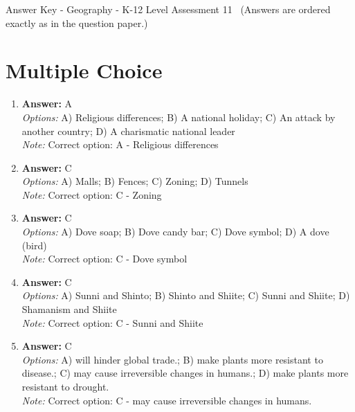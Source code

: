 \documentclass[12pt]{article}
\begin{document}
\begin{center}
Answer Key - Geography - K-12 Level Assessment 11 \
\small (Answers are ordered exactly as in the question paper.)
\end{center}

\section*{Multiple Choice}
\begin{enumerate}[label=\arabic*.]
\item \textbf{Answer:} A
\\ \textit{Options:} A) Religious differences; B) A national holiday; C) An attack by another country; D) A charismatic national leader
\\ \textit{Note:} Correct option: A - Religious differences
\item \textbf{Answer:} C
\\ \textit{Options:} A) Malls; B) Fences; C) Zoning; D) Tunnels
\\ \textit{Note:} Correct option: C - Zoning
\item \textbf{Answer:} C
\\ \textit{Options:} A) Dove soap; B) Dove candy bar; C) Dove symbol; D) A dove (bird)
\\ \textit{Note:} Correct option: C - Dove symbol
\item \textbf{Answer:} C
\\ \textit{Options:} A) Sunni and Shinto; B) Shinto and Shiite; C) Sunni and Shiite; D) Shamanism and Shiite
\\ \textit{Note:} Correct option: C - Sunni and Shiite
\item \textbf{Answer:} C
\\ \textit{Options:} A) will hinder global trade.; B) make plants more resistant to disease.; C) may cause irreversible changes in humans.; D) make plants more resistant to drought.
\\ \textit{Note:} Correct option: C - may cause irreversible changes in humans.
\end{enumerate}
\end{document}
